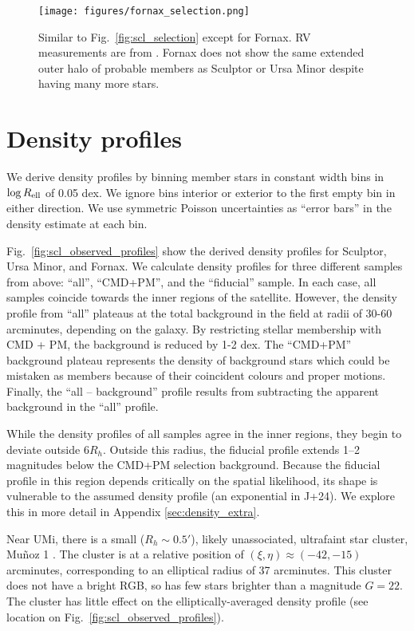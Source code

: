 \begin{figure}
\centering
\texttt{[image: figures/fornax\_selection.png]}
\caption[Fornax sample selection]{Similar to
Fig.~\ref{fig:scl_selection} except for Fornax. RV measurements are from
\citet{WMO2009}. Fornax does not show the same extended outer halo of
probable members as Sculptor or Ursa Minor despite having many more
stars.}\label{fig:fornax_selection}
\end{figure}

\section{Density profiles}\label{density-profiles}

We derive density profiles by binning member stars in constant width
bins in \(\log R_{\rm ell}\) of 0.05 dex. We ignore bins interior or
exterior to the first empty bin in either direction. We use symmetric
Poisson uncertainties as ``error bars'' in the density estimate at each
bin.

Fig.~\ref{fig:scl_observed_profiles} show the derived density profiles
for Sculptor, Ursa Minor, and Fornax. We calculate density profiles for
three different samples from above: ``all'', ``CMD+PM'', and the
``fiducial'' sample. In each case, all samples coincide towards the
inner regions of the satellite. However, the density profile from
``all'' plateaus at the total background in the field at radii of 30-60
arcminutes, depending on the galaxy. By restricting stellar membership
with CMD + PM, the background is reduced by 1-2 dex. The ``CMD+PM''
background plateau represents the density of background stars which
could be mistaken as members because of their coincident colours and
proper motions. Finally, the ``all -- background'' profile results from
subtracting the apparent background in the ``all'' profile.

While the density profiles of all samples agree in the inner regions,
they begin to deviate outside \(6 R_h\). Outside this radius, the
fiducial profile extends 1--2 magnitudes below the CMD+PM selection
background. Because the fiducial profile in this region depends
critically on the spatial likelihood, its shape is vulnerable to the
assumed density profile (an exponential in J+24). We explore this in
more detail in Appendix \ref{sec:density_extra}.

Near UMi, there is a small (\(R_h\sim 0.5'\)), likely unassociated,
ultrafaint star cluster, Muñoz 1 \citep{munoz+2012}. The cluster is at a
relative position of \((\xi, \eta) \approx(-42, -15)\) arcminutes,
corresponding to an elliptical radius of 37 arcminutes. This cluster
does not have a bright RGB, so has few stars brighter than a magnitude
\(G=22\). The cluster has little effect on the elliptically-averaged
density profile (see location on Fig.~\ref{fig:scl_observed_profiles}).

